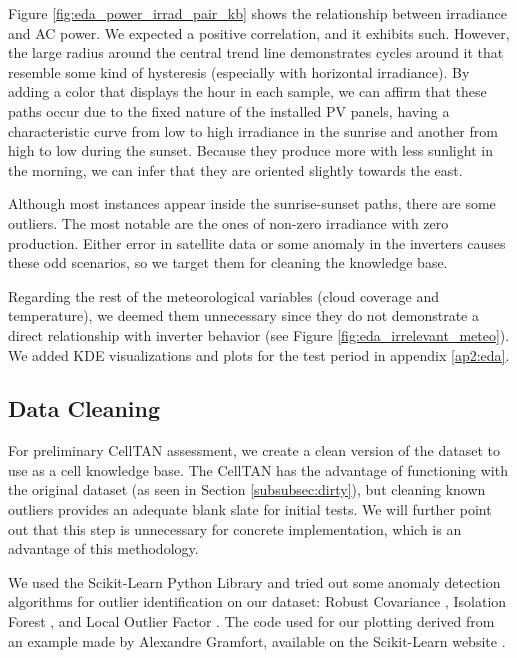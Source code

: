 Figure \ref{fig:eda_power_irrad_pair_kb} shows the relationship between irradiance and AC power. We expected a positive correlation, and it exhibits such. However, the large radius around the central trend line demonstrates cycles around it that resemble some kind of hysteresis (especially with horizontal irradiance). By adding a color that displays the hour in each sample, we can affirm that these paths occur due to the fixed nature of the installed PV panels, having a characteristic curve from low to high irradiance in the sunrise and another from high to low during the sunset. Because they produce more with less sunlight in the morning, we can infer that they are oriented slightly towards the east.

Although most instances appear inside the sunrise-sunset paths, there are some outliers. The most notable are the ones of non-zero irradiance with zero production. Either error in satellite data or some anomaly in the inverters causes these odd scenarios, so we target them for cleaning the knowledge base.

Regarding the rest of the meteorological variables (cloud coverage and temperature), we deemed them unnecessary since they do not demonstrate a direct relationship with inverter behavior (see Figure \ref{fig:eda_irrelevant_meteo}). We added KDE visualizations and plots for the test period in appendix \ref{ap2:eda}.

\subsection{Data Cleaning}

For preliminary CellTAN assessment, we create a clean version of the dataset to use as a cell knowledge base. The CellTAN has the advantage of functioning with the original dataset (as seen in Section \ref{subsubsec:dirty}), but cleaning known outliers provides an adequate blank slate for initial tests. We will further point out that this step is unnecessary for concrete implementation, which is an advantage of this methodology.

We used the Scikit-Learn Python Library and tried out some anomaly detection algorithms for outlier identification on our dataset: Robust Covariance \cite{Rousseeuw1999}, Isolation Forest \cite{Liu2008} \cite{Liu2012}, and Local Outlier Factor \cite{Breunig2000}. The code used for our plotting derived from an example made by Alexandre Gramfort, available on the Scikit-Learn website \cite{sklearn_example}.


